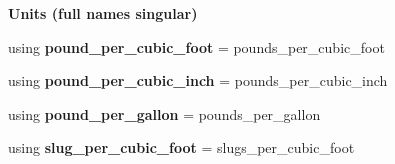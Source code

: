 \begin{Indent}{\bf Units (full names singular)}
\begin{DoxyCompactItemize}
\item 
\hypertarget{namespaceunits_1_1density_acc97dd4b4c8588ff5241647703450576}{}using {\bfseries pound\+\_\+per\+\_\+cubic\+\_\+foot} = pounds\+\_\+per\+\_\+cubic\+\_\+foot\label{namespaceunits_1_1density_acc97dd4b4c8588ff5241647703450576}

\item 
\hypertarget{namespaceunits_1_1density_abdbb235513f1441999d1512f6aea6a3e}{}using {\bfseries pound\+\_\+per\+\_\+cubic\+\_\+inch} = pounds\+\_\+per\+\_\+cubic\+\_\+inch\label{namespaceunits_1_1density_abdbb235513f1441999d1512f6aea6a3e}

\item 
\hypertarget{namespaceunits_1_1density_a714b55c4b98012861ff8e5a935dac7f7}{}using {\bfseries pound\+\_\+per\+\_\+gallon} = pounds\+\_\+per\+\_\+gallon\label{namespaceunits_1_1density_a714b55c4b98012861ff8e5a935dac7f7}

\item 
\hypertarget{namespaceunits_1_1density_aeb8eac3781e097e8320bb4644217f53e}{}using {\bfseries slug\+\_\+per\+\_\+cubic\+\_\+foot} = slugs\+\_\+per\+\_\+cubic\+\_\+foot\label{namespaceunits_1_1density_aeb8eac3781e097e8320bb4644217f53e}

\end{DoxyCompactItemize}
\end{Indent}
